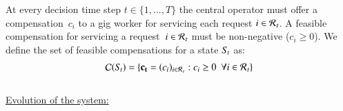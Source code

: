 At every decision time step $t \in \{1,...,T\}$ the central operator must offer a compensation~$c_i$ to a gig worker for servicing each request $i \in \mathcal{R}\hspace{0.05em}_{t}$. A feasible compensation for servicing a request~$i \in \mathcal{R}\hspace{0.05em}_{t}$ must be non-negative ($c_i \geq 0$). We define the set of feasible compensations for a state $S\hspace{-0.1em}_t$ as:
\begin{align}
\mathcal{C}(S\hspace{-0.1em}_t) = \{\mathbf{c_t} = (c_i)_{i \in \mathcal{R}\hspace{0.05em}_{t}} :  c_i \geq 0  \ \ \forall i \in \mathcal{R}\hspace{0.05em}_{t} \}
\end{align} \\
\noindent \underline{Evolution of the system:} 
